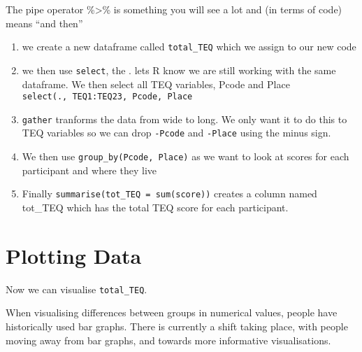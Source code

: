 \documentclass[]{book}
\newenvironment{Shaded}{\begin{snugshade}}{\end{snugshade}}
\newcommand{\DataTypeTok}[1]{\textcolor[rgb]{0.13,0.29,0.53}{#1}}
\newcommand{\KeywordTok}[1]{\textcolor[rgb]{0.13,0.29,0.53}{\textbf{#1}}}
\newcommand{\NormalTok}[1]{#1}
\newcommand{\OperatorTok}[1]{\textcolor[rgb]{0.81,0.36,0.00}{\textbf{#1}}}
\newcommand{\StringTok}[1]{\textcolor[rgb]{0.31,0.60,0.02}{#1}}
\providecommand{\tightlist}{%
  \setlength{\itemsep}{0pt}\setlength{\parskip}{0pt}}
\begin{document}
The pipe operator \%\textgreater{}\% is something you will see a lot and (in terms of code) means ``and then''

\begin{enumerate}
\def\labelenumi{\arabic{enumi}.}
\tightlist
\item
  we create a new dataframe called \texttt{total\_TEQ} which we assign to our new code
\item
  we then use \texttt{select}, the . lets R know we are still working with the same dataframe. We then select all TEQ variables, Pcode and Place \texttt{select(.,\ TEQ1:TEQ23,\ Pcode,\ Place}
\item
  \texttt{gather} tranforms the data from wide to long. We only want it to do this to TEQ variables so we can drop \texttt{-Pcode} and \texttt{-Place} using the minus sign.
\item
  We then use \texttt{group\_by(Pcode,\ Place)} as we want to look at scores for each participant and where they live
\item
  Finally \texttt{summarise(tot\_TEQ\ =\ sum(score))} creates a column named tot\_TEQ which has the total TEQ score for each participant.
\end{enumerate}

\begin{Shaded}
\end{Shaded}

\hypertarget{plotting-data}{%
\section{Plotting Data}\label{plotting-data}}

Now we can visualise \texttt{total\_TEQ}.

When visualising differences between groups in numerical values, people have historically used bar graphs. There is currently a shift taking place, with people moving away from bar graphs, and towards more informative visualisations.
\end{document}
